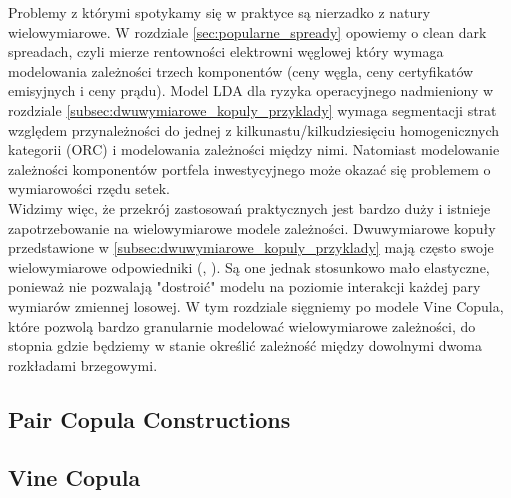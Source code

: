 Problemy z którymi spotykamy się w praktyce są nierzadko z natury wielowymiarowe. W rozdziale \ref{sec:popularne_spready} opowiemy o clean dark spreadach, czyli mierze rentowności elektrowni węglowej który wymaga modelowania zależności trzech komponentów (ceny węgla, ceny certyfikatów emisyjnych i ceny prądu). Model LDA dla ryzyka operacyjnego nadmieniony w rozdziale \ref{subsec:dwuwymiarowe_kopuly_przyklady} wymaga segmentacji strat względem przynależności do jednej z kilkunastu/kilkudziesięciu homogenicznych kategorii (ORC) i modelowania zależności między nimi. Natomiast modelowanie zależności komponentów portfela inwestycyjnego może okazać się problemem o wymiarowości rzędu setek.\\
Widzimy więc, że przekrój zastosowań praktycznych jest bardzo duży i istnieje zapotrzebowanie na wielowymiarowe modele zależności. Dwuwymiarowe kopuły przedstawione w \ref{subsec:dwuwymiarowe_kopuly_przyklady} mają często swoje wielowymiarowe odpowiedniki (\cite{Cherubini_Copula_Methods_in_Finance}, \cite{Kurowicka_Dependence_Modeling}). Są one jednak stosunkowo mało elastyczne, ponieważ nie pozwalają "dostroić" modelu na poziomie interakcji każdej pary wymiarów zmiennej losowej. W tym rozdziale sięgniemy po modele Vine Copula, które pozwolą bardzo granularnie modelować wielowymiarowe zależności, do stopnia gdzie będziemy w stanie określić zależność między dowolnymi dwoma rozkładami brzegowymi.\\

\subsection{Pair Copula Constructions}
\label{subsec:pair_copula_constructions}

	
\subsection{Vine Copula}
\label{subsec:vine_copula}

